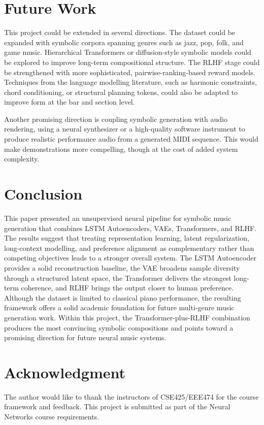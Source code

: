 \documentclass[conference]{IEEEtran}
\begin{document}
\section{Future Work}
This project could be extended in several directions. The dataset could be expanded with symbolic corpora spanning genres such as jazz, pop, folk, and game music. Hierarchical Transformers or diffusion-style symbolic models could be explored to improve long-term compositional structure. The RLHF stage could be strengthened with more sophisticated, pairwise-ranking-based reward models. Techniques from the language modelling literature, such as harmonic constraints, chord conditioning, or structural planning tokens, could also be adapted to improve form at the bar and section level.

Another promising direction is coupling symbolic generation with audio rendering, using a neural synthesizer or a high-quality software instrument to produce realistic performance audio from a generated MIDI sequence. This would make demonstrations more compelling, though at the cost of added system complexity.

\section{Conclusion}
This paper presented an unsupervised neural pipeline for symbolic music generation that combines LSTM Autoencoders, VAEs, Transformers, and RLHF. The results suggest that treating representation learning, latent regularization, long-context modelling, and preference alignment as complementary rather than competing objectives leads to a stronger overall system. The LSTM Autoencoder provides a solid reconstruction baseline, the VAE broadens sample diversity through a structured latent space, the Transformer delivers the strongest long-term coherence, and RLHF brings the output closer to human preference. Although the dataset is limited to classical piano performance, the resulting framework offers a solid academic foundation for future multi-genre music generation work. Within this project, the Transformer-plus-RLHF combination produces the most convincing symbolic compositions and points toward a promising direction for future neural music systems.

\section*{Acknowledgment}
The author would like to thank the instructors of CSE425/EEE474 for the course framework and feedback. This project is submitted as part of the Neural Networks course requirements.
\end{document}
